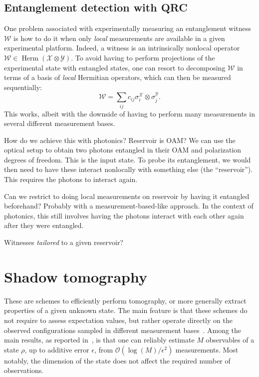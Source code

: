 \documentclass[12pt]{report}
\newcommand{\calY}{{\mathcal{Y}}}
\newcommand{\calO}{{\mathcal{O}}}
\newcommand{\calW}{{\mathcal{W}}}
\newcommand{\calX}{{\mathcal{X}}}
\DeclareMathOperator{\Herm}{Herm}
\begin{document}
\subsection{Entanglement detection with QRC}

One problem associated with experimentally measuring an entanglement witness $\calW$ is how to do it when only \emph{local} measurements are available in a given experimental platform.
Indeed, a witness is an intrinsically nonlocal operator $\calW\in\Herm(\calX\otimes\calY)$.
To avoid having to perform projections of the experimental state with entangled states, one can resort to decomposing $\calW$ in terms of a basis of \emph{local} Hermitian operators, which can then be measured sequentially:
\begin{equation}
	\calW = \sum_{ij} c_{ij} \sigma_i^\calX\otimes\sigma_j^\calY.
\end{equation}
This works, albeit with the downside of having to perform many measurements in several different measurement bases.



How do we achieve this with photonics? Reservoir is OAM?
We can use the optical setup to obtain two photons entangled in their OAM and polarization degrees of freedom.
This is the input state. To probe its entanglement, we would then need to have these interact nonlocally with something else (the ``reservoir'').
This requires the photons to interact again.

Can we restrict to doing local measurements on reservoir by having it entangled beforehand?
Probably with a measurement-based-like approach.
In the context of photonics, this still involves having the photons interact with each other again after they were entangled.

Witnesses \emph{tailored} to a given reservoir?

\section{Shadow tomography}

These are schemes to efficiently perform tomography, or more generally extract properties of a given unknown state. The main feature is that these schemes do not require to assess expectation values, but rather operate directly on the observed configurations sampled in different measurement bases~\parencite{aaronson2017shadow,huang2020predicting}.
Among the main results, as reported in~\parencite{huang2020predicting}, is that one can reliably estimate $M$ observables of a state $\rho$, up to additive error $\epsilon$, from $\calO( \log(M)/\epsilon^2)$ measurements.
Most notably, the dimension of the state does not affect the required number of observations.
\end{document}
